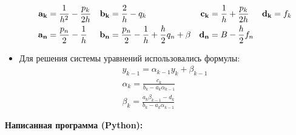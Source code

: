 \documentclass[a4paper,12pt]{report}
\begin{document}
\begin{itemize}
{\begin{equation}
\begin{aligned}
{\bf a_k} & = \frac{1}{h^2} - \frac{p_k}{2h} & {\bf b_k} & = \frac{2}{h} - q_k & {\bf c_k} & = \frac{1}{h} + \frac{p_k}{2h} & {\bf d_k} & = f_k \\
{\bf a_n} & = \frac{p_n}{2} - \frac{1}{h} & {\bf b_n} & = \frac{p_n}{2} - \frac{1}{h} + \frac{h}{2}q_n + \beta & {\bf d_n} & = B - \frac{h}{2}f_n
\end{aligned}
\end{equation}
}
\item{Для решения системы уравнений использовались формулы:
\begin{gather}
y_{k-1} = \alpha_{k-1}y_k + \beta_{k-1} \\
\alpha_k = \frac{c_k}{b_k - a_{k}\alpha_{k-1}} \\
\beta_k = \frac{a_{k}\beta_{k-1} - d_k}{b_k - a_{k}\alpha_{k-1}}
\end{gather}
}
\end{itemize}

\newpage
\begin{center}
\Large
{\bf Написанная программа (Python):}
\end{center}
\end{document}
